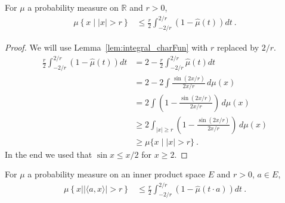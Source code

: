 


\begin{lemma}\label{lem:charFun_bound_large}
\mathlibok
{}
For $\mu$ a probability measure on $\mathbb{R}$ and $r > 0$,
\begin{align*}
\mu \left\{x \mid |x| > r\right\}
&\le \frac{r}{2} \int_{-2/r}^{2/r} (1 - \hat{\mu}(t))dt
\: .
\end{align*}
\end{lemma}

\begin{proof}
\leanok
We will use Lemma~\ref{lem:integral_charFun} with $r$ replaced by $2/r$.
\begin{align*}
    \frac{r}{2} \int_{-2/r}^{2/r} (1 - \hat{\mu}(t))dt
    &= 2 - \frac{r}{2} \int_{-2/r}^{2/r} \hat{\mu}(t)dt
    \\
    &= 2 - 2 \int \frac{\sin(2 x / r)}{2 x / r} \, d\mu(x)
    \\
    &= 2 \int \left(1 - \frac{\sin(2 x / r)}{2 x / r}\right) \, d\mu(x)
    \\
    &\ge 2 \int_{|x| \ge r} \left(1 - \frac{\sin(2 x / r)}{2 x / r}\right) \, d\mu(x)
    \\
    &\ge \mu\{x \mid |x| > r\}
    \: .
\end{align*}
In the end we used that $\sin x \le x /2$ for $x \ge 2$.
\end{proof}


\begin{lemma}\label{lem:charFun_bound_inner}
\mathlibok
{}
For $\mu$ a probability measure on an inner product space $E$ and $r > 0$, $a \in E$,
\begin{align*}
\mu \left\{x \mid \vert\langle a, x\rangle\vert > r\right\}
&\le \frac{r}{2} \int_{-2/r}^{2/r} (1 - \hat{\mu}(t \cdot a))dt
\: .
\end{align*}
\end{lemma}

